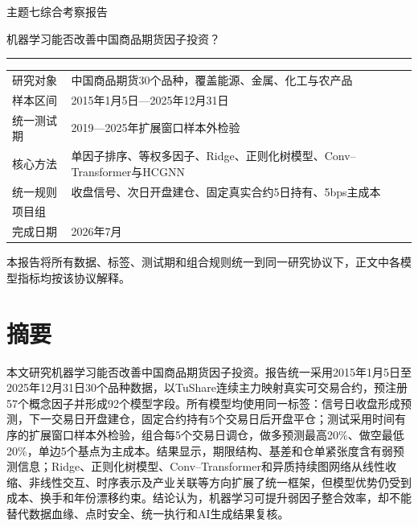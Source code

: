 \documentclass[UTF8,zihao=-4,fontset=ubuntu]{ctexart}
\begin{document}
\begin{titlepage}
\centering
\vspace*{1.6cm}
{\heiti{} 主题七综合考察报告\par}
\vspace{1.2cm}
{\heiti{} 机器学习能否改善中国商品期货因子投资？\par}
\vspace{1.2cm}
\rule{0.82\textwidth}{0.8pt}
\vspace{1.0cm}

\begin{tabular}{@{}L{3.2cm}L{10.0cm}@{}}
研究对象 & 中国商品期货30个品种，覆盖能源、金属、化工与农产品 \\
样本区间 & 2015年1月5日—2025年12月31日 \\
统一测试期 & 2019—2025年扩展窗口样本外检验 \\
核心方法 & 单因子排序、等权多因子、Ridge、正则化树模型、Conv--Transformer与HCGNN \\
统一规则 & 收盘信号、次日开盘建仓、固定真实合约5日持有、5bps主成本 \\
项目组 & \underline{\hspace{8cm}} \\
完成日期 & 2026年7月 \\
\end{tabular}

\vfill
{\songti{} 本报告将所有数据、标签、测试期和组合规则统一到同一研究协议下，正文中各模型指标均按该协议解释。\par}
\end{titlepage}


\section*{摘要}
本文研究机器学习能否改善中国商品期货因子投资。报告统一采用2015年1月5日至2025年12月31日30个品种数据，以TuShare连续主力映射真实可交易合约，预注册57个概念因子并形成92个模型字段。所有模型均使用同一标签：信号日收盘形成预测，下一交易日开盘建仓，固定合约持有5个交易日后开盘平仓；测试采用时间有序的扩展窗口样本外检验，组合每5个交易日调仓，做多预测最高20\%、做空最低20\%，单边5个基点为主成本。结果显示，期限结构、基差和仓单紧张度含有弱预测信息；Ridge、正则化树模型、Conv--Transformer和异质持续图网络从线性收缩、非线性交互、时序表示及产业关联等方向扩展了统一框架，但模型优势仍受到成本、换手和年份漂移约束。结论认为，机器学习可提升弱因子整合效率，却不能替代数据血缘、点时安全、统一执行和AI生成结果复核。
\end{document}
